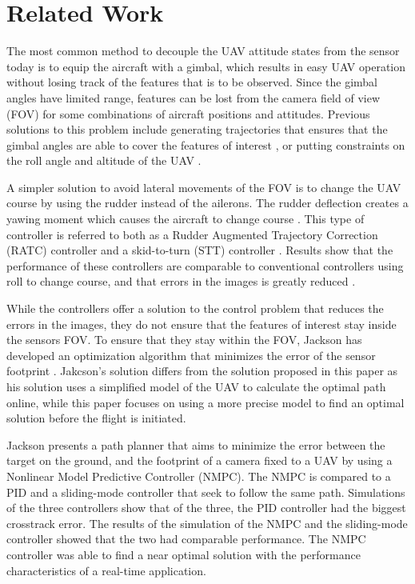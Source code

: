 \section{Related Work}

The most common method to decouple the UAV attitude states from the sensor today is to equip the aircraft with a gimbal, which results in easy UAV operation without losing track of the features that is to be observed. Since the gimbal angles have limited range, features can be lost from the camera field of view (FOV) for some combinations of aircraft positions and attitudes. Previous solutions to this problem include generating trajectories that ensures that the gimbal angles are able to cover the features of interest \cite{nundalSKJONG}, or putting constraints on the roll angle and altitude of the UAV \cite{constraintsEGBERT}.

A simpler solution to avoid lateral movements of the FOV is to change the UAV course by using the rudder instead of the ailerons. The rudder deflection creates a yawing moment which causes the aircraft to change course \cite{ratcFISHER}. This type of controller is referred to both as a Rudder Augmented Trajectory Correction (RATC) controller \cite{ratcFISHER} and a skid-to-turn (STT) controller \cite{skidMILLS}. Results show that the performance of these controllers are comparable to conventional controllers using roll to change course, and that errors in the images is greatly reduced \cite{ratcFISHER}\cite{skidMILLS}\cite{alternateAHSAN}.

While the controllers offer a solution to the control problem that reduces the errors in the images, they do not ensure that the features of interest stay inside the sensors FOV. To ensure that they stay within the FOV, Jackson has developed an optimization algorithm that minimizes the error of the sensor footprint \cite{optimJACKSON}. Jakcson's solution differs from the solution proposed in this paper as his solution uses a simplified model of the UAV to calculate the optimal path online, while this paper focuses on using a more precise model to find an optimal solution before the flight is initiated.

Jackson presents a path planner that aims to minimize the error between the target on the ground, and the footprint of a camera fixed to a UAV by using a Nonlinear Model Predictive Controller (NMPC). The NMPC is compared to a PID and a sliding-mode controller that seek to follow the same path. Simulations of the three controllers show that of the three, the PID controller had the biggest crosstrack error. The results of the simulation of the NMPC and the sliding-mode controller showed that the two had comparable performance. The NMPC controller was able to find a near optimal solution with the performance characteristics of a real-time application.

